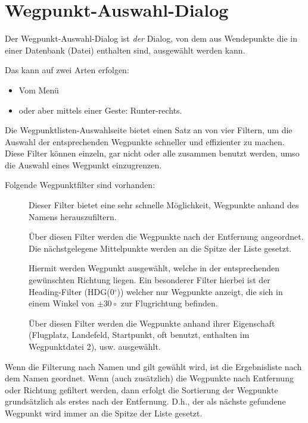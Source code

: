 \section{Wegpunkt-Auswahl-Dialog}\label{sec:waypoint-selector-dialog}

Der Wegpunkt-Auswahl-Dialog ist \textsl{der} Dialog, von dem aus Wendepunkte die in einer Datenbank (Datei) enthalten sind, ausgewählt werden kann.

Das kann auf zwei Arten erfolgen:
\begin{itemize}
\item  Vom Menü \blink{}
\item  oder aber mittels einer Geste: Runter-rechts.
\end{itemize}

Die Wegpunktlisten-Auswahlseite bietet einen Satz an von vier Filtern, um die Auswahl der entsprechenden Wegpunkte schneller und effizienter zu machen. Diese Filter können einzeln, gar nicht oder alle zusammen benutzt werden, umso die Auswahl eines Wegpunkt  einzugrenzen.

Folgende Wegpunktfilter sind vorhanden:

\begin{description}
\item[] Dieser Filter bietet eine sehr schnelle Möglichkeit, Wegpunkte anhand des Namens herauszufiltern.
\item[] Über diesen Filter werden die Wegpunkte nach der Entfernung angeordnet. Die nächstgelegene Mittelpunkte werden an die Spitze der Liste gesetzt.
\item[] Hiermit werden Wegpunkt ausgewählt, welche in der entsprechenden gewünschten Richtung liegen.
    Ein besonderer Filter hierbei ist der Heading-Filter (\textsf{HDG(0$^\circ$)}) welcher nur Wegpunkte anzeigt, die sich in einem Winkel von $\pm 30\circ$ zur Flugrichtung befinden.
\item[] Über diesen Filter werden die Wegpunkte anhand ihrer Eigenschaft (Flugplatz, Landefeld, Startpunkt, oft benutzt, enthalten im Wegpunktdatei 2), usw. ausgewählt.
\end{description}

Wenn die Filterung nach Namen und gilt gewählt wird, ist die Ergebnisliste nach dem Namen geordnet. Wenn (auch zusätzlich) die Wegpunkte nach Entfernung oder Richtung gefiltert werden, dann erfolgt die Sortierung der Wegpunkte grundsätzlich als erstes nach der Entfernung.
D.h., der als nächste gefundene Wegpunkt wird immer an die Spitze der Liste gesetzt.

